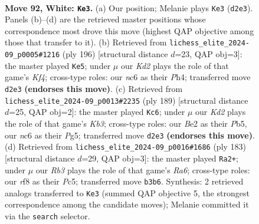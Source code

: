 \documentclass[11pt]{article}
\begin{document}
\clearpage

\begin{figure}[p]\centering
\begin{subfigure}{0.46\textwidth}\centering
\resizebox{\linewidth}{!}{%
\newchessgame
\chessboard[
  setfen={5r2/8/P1nk4/8/8/1R4PP/2PKB3/8 w - - 17 92},
  showmover=false,
  pgfstyle=straightmove, color=movearrow, markmove={d2-e3}
]}
\caption{}
\end{subfigure}\hfill
\begin{subfigure}{0.46\textwidth}\centering
\resizebox{\linewidth}{!}{%
\newchessgame
\chessboard[
  setfen={2r5/4k3/1R4P1/7p/4BK1P/8/8/8 w - - 1 99},
  showmover=false,
  pgfstyle=straightmove, color=movearrow, markmove={f4-e5}
]}
\caption{}
\end{subfigure}
\\[4pt]
\begin{subfigure}{0.46\textwidth}\centering
\resizebox{\linewidth}{!}{%
\newchessgame
\chessboard[
  setfen={8/8/1k5p/pp4p1/1b6/8/K7/8 b - - 1 95},
  showmover=false,
  pgfstyle=straightmove, color=movearrow, markmove={b6-c6}
]}
\caption{}
\end{subfigure}\hfill
\begin{subfigure}{0.46\textwidth}\centering
\resizebox{\linewidth}{!}{%
\newchessgame
\chessboard[
  setfen={8/7p/5k2/2p2b2/1pP2P2/r7/3K4/8 b - - 3 92},
  showmover=false,
  pgfstyle=straightmove, color=movearrow, markmove={a3-a2}
]}
\caption{}
\end{subfigure}
\caption{\textbf{Move 92, White: \texttt{Ke3}.} (a) Our position; Melanie plays \texttt{Ke3} (\texttt{d2e3}). Panels (b)--(d) are the retrieved master positions whose correspondence most drove this move (highest QAP objective among those that transfer to it). (b) Retrieved from \texttt{lichess\_elite\_2024-09\_p0005\#1216} (ply 196) [structural distance $d$=23, QAP obj=3]: the master played \texttt{Ke5}; under $\mu$ our \emph{Kd2} plays the role of that game's \emph{Kf4}; cross-type roles: our \emph{n}c6 as their \emph{P}h4; transferred move \texttt{d2e3} \textbf{(endorses this move)}. (c) Retrieved from \texttt{lichess\_elite\_2024-09\_p0013\#2235} (ply 189) [structural distance $d$=25, QAP obj=2]: the master played \texttt{Kc6}; under $\mu$ our \emph{Kd2} plays the role of that game's \emph{Kb3}; cross-type roles: our \emph{B}e2 as their \emph{P}b5, our \emph{n}c6 as their \emph{P}g5; transferred move \texttt{d2e3} \textbf{(endorses this move)}. (d) Retrieved from \texttt{lichess\_elite\_2024-09\_p0016\#1686} (ply 183) [structural distance $d$=29, QAP obj=3]: the master played \texttt{Ra2+}; under $\mu$ our \emph{Rb3} plays the role of that game's \emph{Ra6}; cross-type roles: our \emph{r}f8 as their \emph{P}c5; transferred move \texttt{b3b6}. Synthesis: 2 retrieved analogs transferred to \texttt{Ke3} (summed QAP objective 5, the strongest correspondence among the candidate moves); Melanie committed it via the \texttt{search} selector.}
\label{fig:thought-m182}
\end{figure}
\end{document}
